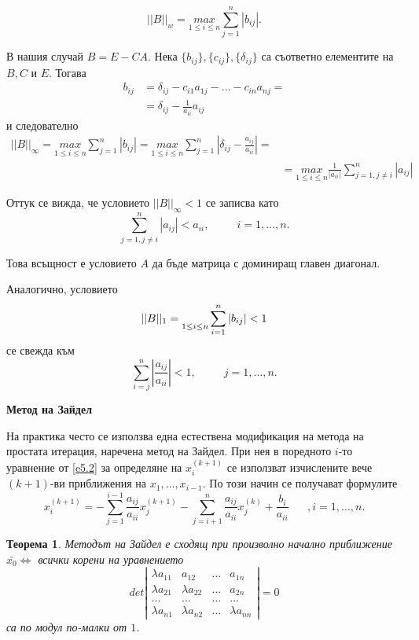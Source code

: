 \documentclass[12pt]{article}
\numberwithin{equation}{section}
\newtheorem{theorem}{Теорема}
\numberwithin{theorem}{section}
\numberwithin{definition}{section}
\numberwithin{corollary}{section}
\begin{document}
\[
||B||_w = \underset{1\leq i\leq n}{max}\displaystyle\sum_{j=1}^n|b_{ij}|.
\]
\par
В нашия случай $B=E-CA$. Нека $\{b_{ij}\},\{c_{ij}\},\{\delta_{ij}\}$ са съответно елементите на $B,C$ и $E$. Тогава
\begin{align*}
b_{ij}&=\delta_{ij}-c_{i1}a_{1j} - \dotso -c_{in}a_{nj}=\\&=\delta_{ij}-\frac{1}{a_{ii}}a_{ij}
\end{align*}
и следователно
\begin{align*}
||B||_\infty = \underset{1\leq i\leq n}{max}\displaystyle\sum_{j=1}^n|b_{ij}|=
\underset{1\leq i\leq n}{max}\displaystyle\sum_{j=1}^{n}\left|\delta_{ij}-\frac{a_{ij}}{a_{ii}}\right|=\\&=\underset{1\leq i\leq n}{max}\frac{1}{|a_{ii}|}\displaystyle\sum_{j=1,j\neq i}^n|a_{ij}|
\end{align*}
\par
Оттук се вижда, че условието $||B||_\infty<1$ се записва като
\[
\displaystyle\sum_{j=1,j\neq i}^n|a_{ij}|<a_{ii},\hspace{30pt}i=1,\dotso,n.
\]
\par
Това всъщност е условието $A$ да бъде матрица с доминиращ главен диагонал.
\par
Аналогично, условието
\[
||B||_1=\underset{1\leq i\leq n}\displaystyle\sum_{i=1}^n|b_{ij}|<1
\]
се свежда към
\[
\displaystyle\sum_{i=j}^n\left|\frac{a_{ij}}{a_{ii}}\right|<1,\hspace{30pt}j=1,\dotso,n.
\]
\begin{center}
\textbf{Метод на Зайдел}
\end{center}
\par
На практика често се използва една естествена модификация на метода на простата итерация, наречена метод на Зайдел. При нея в поредното $i$-то уравнение от \ref{e5.2} за определяне на $x_i^{(k+1)}$ се използват изчислените вече $(k+1)$-ви приближения на $x_1,\dotso,x_{i-1}$. По този начин се получават формулите
\[
x_i^{(k+1)} = -\displaystyle\sum_{j=1}^{i-1}\frac{a_{ij}}{a_{ii}}x_j^{(k+1)}
              -\displaystyle\sum_{j=i+1}^n\frac{a_{ij}}{a_{ii}}x_j^{(k)}
              +\frac{b_i}{a_{ii}}\hspace{20pt},i=1,\dotso,n.
\]
\begin{theorem}\label{t5.2}
Методът на Зайдел е сходящ при произволно начално приближение $\bar{x_0}\iff$ всички корени на уравнението
\[
det\left|\begin{array}{cccc}
\lambda a_{11}&a_{12}&\dotso&a_{1n}\\
\lambda a_{21}&\lambda a_{22}&\dotso&a_{2n}\\
\dotso&\dotso&\dotso&\dotso\\
\lambda a_{n1}&\lambda a_{n2}&\dotso&\lambda a_{nn}

\end{array}\right|=0
\]
са по модул по-малки от $1$.
\end{theorem}
\end{document}
